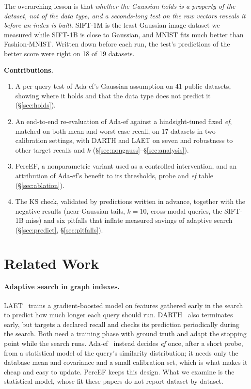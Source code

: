 \documentclass[sigconf,anonymous]{acmart}
\newcommand{\ef}{\textit{ef}}
\begin{document}
The overarching lesson is that \emph{whether the Gaussian holds is a property of the dataset, not
of the data type, and a seconds-long test on the raw vectors reveals it before an index is built}.
SIFT-1M is the least Gaussian image dataset we measured while SIFT-1B is close to Gaussian, and
MNIST fits much better than Fashion-MNIST. Written down before each run, the test's predictions of
the better score were right on 18 of 19 datasets.

\textbf{Contributions.}
\begin{enumerate}
\item A per-query test of Ada-ef's Gaussian assumption on 41 public datasets, showing where it holds
  and that the data type does not predict it (\S\ref{sec:holds}).
\item An end-to-end re-evaluation of Ada-ef against a hindsight-tuned fixed \ef{}, matched on both
  mean and worst-case recall, on 17 datasets in two calibration settings, with DARTH and LAET on
  seven and robustness to other target recalls and $k$ (\S\ref{sec:nongauss}--\S\ref{sec:analysis}).
\item PercEF, a nonparametric variant used as a controlled intervention, and an attribution of
  Ada-ef's benefit to its thresholds, probe and \ef{} table (\S\ref{sec:ablation}).
\item The KS check, validated by predictions written in advance, together with the negative results
  (near-Gaussian tails, $k = 10$, cross-modal queries, the SIFT-1B miss) and six pitfalls that
  inflate measured savings of adaptive search (\S\ref{sec:predict}, \S\ref{sec:pitfalls}).
\end{enumerate}

\section{Related Work}

\paragraph{Adaptive search in graph indexes.}
LAET~\cite{li2020laet} trains a gradient-boosted model on features gathered early in the search to
predict how much longer each query should run. DARTH~\cite{chatzakis2026darth} also terminates
early, but targets a declared recall and checks its prediction periodically during the search.
Both need a training phase with ground truth and adapt the stopping point while the search runs.
Ada-ef~\cite{zhang2026adaef} instead decides \ef{} once, after a short probe, from a statistical
model of the query's similarity distribution; it needs only the database mean and covariance and a
small calibration set, which is what makes it cheap and easy to update. PercEF keeps this design.
What we examine is the statistical model, whose fit these papers do not report dataset by dataset.
\end{document}
